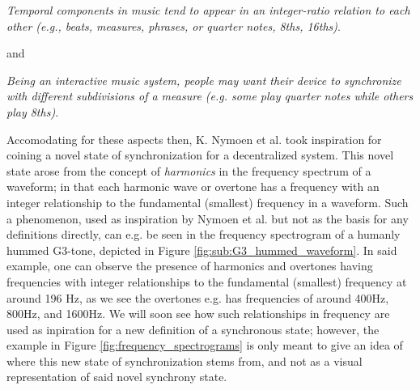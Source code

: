 \textit{Temporal components in music tend to appear in an integer-ratio relation to each other (e.g., beats, measures, phrases, or quarter notes, 8ths, 16ths)}. \nl

and \nl

\textit{Being an interactive music system, people may want their device to synchronize with different subdivisions of a measure (e.g. some play quarter notes while others play 8ths).} \nl

Accomodating for these aspects then, K. Nymoen et al. took inspiration for coining a novel state of synchronization for a decentralized system. This novel state arose from the concept of \textit{harmonics} in the frequency spectrum of a waveform; in that each harmonic wave or overtone has a frequency with an integer relationship to the fundamental (smallest) frequency in a waveform. Such a phenomenon, used as inspiration by Nymoen et al. but not as the basis for any definitions directly, can e.g. be seen in the frequency spectrogram of a humanly hummed G3-tone, depicted in Figure \ref{fig:sub:G3_hummed_waveform}. In said example, one can observe the presence of harmonics and overtones having frequencies with integer relationships to the fundamental (smallest) frequency at around 196 Hz, as we see the overtones e.g. has frequencies of around 400Hz, 800Hz, and 1600Hz. We will soon see how such relationships in frequency are used as inpiration for a new definition of a synchronous state; however, the example in Figure \ref{fig:frequency_spectrograms} is only meant to give an idea of where this new state of synchronization stems from, and not as a visual representation of said novel synchrony state.

